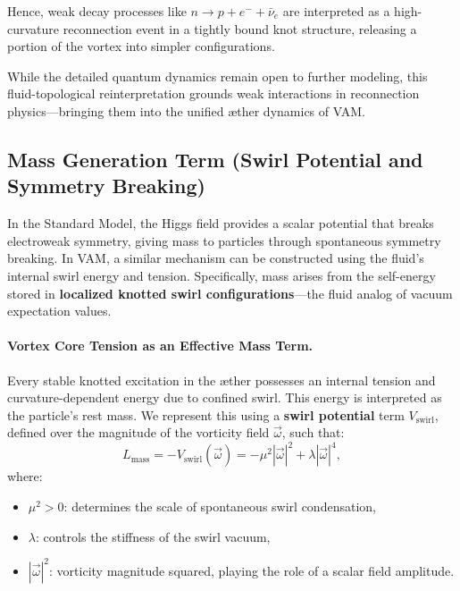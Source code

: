 \documentclass[a4paper,12pt]{article}
\begin{document}
Hence, weak decay processes like \( n \to p + e^- + \bar{\nu}_e \) are interpreted as a high-curvature reconnection event in a tightly bound knot structure, releasing a portion of the vortex into simpler configurations.

\medskip
While the detailed quantum dynamics remain open to further modeling, this fluid-topological reinterpretation grounds weak interactions in reconnection physics—bringing them into the unified æther dynamics of VAM.

\subsection{Mass Generation Term (Swirl Potential and Symmetry Breaking)}

In the Standard Model, the Higgs field provides a scalar potential that breaks electroweak symmetry, giving mass to particles through spontaneous symmetry breaking. In VAM, a similar mechanism can be constructed using the fluid’s internal swirl energy and tension. Specifically, mass arises from the self-energy stored in \textbf{localized knotted swirl configurations}—the fluid analog of vacuum expectation values.

\vspace{0.5em}
\paragraph{Vortex Core Tension as an Effective Mass Term.}
Every stable knotted excitation in the æther possesses an internal tension and curvature-dependent energy due to confined swirl. This energy is interpreted as the particle’s rest mass. We represent this using a \textbf{swirl potential} term \( V_{\text{swirl}} \), defined over the magnitude of the vorticity field \( \vec{\omega} \), such that:
\begin{equation}
    L_{\text{mass}} = -V_{\text{swirl}}(\vec{\omega}) = -\mu^2 |\vec{\omega}|^2 + \lambda |\vec{\omega}|^4,
    \label{eq:mass-term}
\end{equation}
where:
\begin{itemize}
    \item \( \mu^2 > 0 \): determines the scale of spontaneous swirl condensation,
    \item \( \lambda \): controls the stiffness of the swirl vacuum,
    \item \( |\vec{\omega}|^2 \): vorticity magnitude squared, playing the role of a scalar field amplitude.
\end{itemize}
\end{document}
